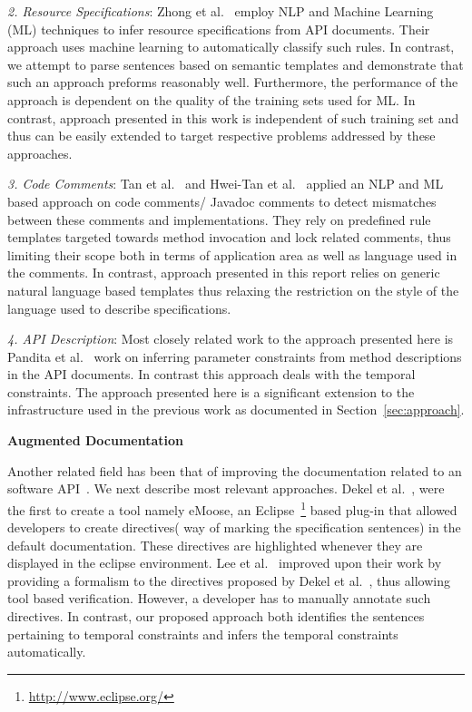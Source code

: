 \textit{2. Resource Specifications}: Zhong et al.~\cite{zhong09SE} employ NLP and  Machine Learning (ML) techniques to infer resource specifications from API documents. Their approach uses machine learning to automatically classify such rules. In contrast, we attempt to parse sentences based on semantic templates and demonstrate that such an approach preforms reasonably well. Furthermore, the performance of the approach is dependent on the quality of the training sets used for ML. In contrast, approach presented in this work is independent of such training set and thus can be easily extended to target respective problems addressed by these approaches.
	
\textit{3. Code Comments}: Tan et al.~\cite{TanSOSP07} and Hwei-Tan et al.~\cite{tcomment} applied an NLP and ML  based approach on code comments/ Javadoc comments to detect mismatches between these comments and implementations. They rely on predefined rule templates targeted towards method invocation and lock related comments, thus limiting their scope both in terms of application area as well as language used in the comments. In contrast, approach presented in this report relies on generic natural language based templates thus relaxing the restriction on the style of the language used to describe specifications.
	
\textit{4. API Description}: Most closely related work to the approach presented here is Pandita et al.~\cite{pandita12:inferring} work on inferring parameter constraints from method descriptions in the API documents. In contrast this approach deals with the temporal constraints. The approach presented here is a significant extension to the infrastructure used in the previous work as documented in Section~\ref{sec:approach}.


\textbf{Augmented Documentation}

Another related field has been that of improving the documentation related to an software API~\cite{Dekel2009,tan2011acomment}. We next describe most relevant approaches. Dekel et al.~\cite{Dekel2009}, were the first to create a tool namely eMoose, an Eclipse~\footnote{\url{http://www.eclipse.org/}} based plug-in that allowed developers to create directives( way of marking the specification sentences) in the default documentation. These directives are highlighted whenever they are displayed in the eclipse environment. Lee et al.~\cite{lee2012towards} improved upon their work by providing a formalism to the directives proposed by Dekel et al.~\cite{Dekel2009}, thus allowing tool based verification. However, a developer has to manually annotate such directives. In contrast, our proposed approach both identifies the sentences pertaining to temporal constraints and infers the temporal constraints automatically. 


